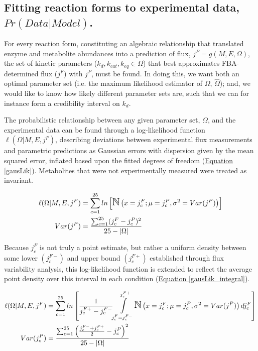 \subsection*{Fitting reaction forms to experimental data, $Pr(Data | Model)$.}

For every reaction form, constituting an algebraic relationship that translated enzyme and metabolite abundances into a prediction of flux, $j^{P} = g(M, E, \Omega)$, the set of kinetic parameters ($k_{d}, k_{cat}, k_{eq} \in \Omega$) that best approximates FBA-determined flux ($j^{F}$) with $j^{P}$, must be found.  In doing this, we want both an optimal parameter set (i.e. the maximum likelihood estimator of $\Omega$, $\hat{\Omega}$); and, we would like to know how likely different parameter sets are, such that we can for instance form a credibility interval on $k_{d}$.

The probabilistic relationship between any given parameter set, $\Omega$, and the experimental data can be found through a log-likelihood function $\ell(\Omega | M, E, j^{P})$, describing deviations between experimental flux measurements and parametric predictions as Gaussian errors with dispersion given by the mean squared error, inflated based upon the fitted degrees of freedom (\hyperref[gausLik]{Equation \ref{gausLik}}). Metabolites that were not experimentally measured were treated as invariant.

\begin{align}
\ell(\Omega | M, E, j^{F}) &= \sum_{c = 1}^{25}ln\left[\mbox{\Large $\mathbb{N}$}\left(x = j^{F}_{c}; \mu = j^{P}_{c}, \sigma^{2} =  Var(j^{P})\right)\right]\notag\\
Var(j^{P}) &= \frac{\sum_{c = 1}^{25} (j^{F}_{c} - j^{P}_{c})^2}{25 - \left\vert{\Omega}\right\vert}\label{gausLik}
\end{align}

Because $j_{c}^{F}$ is not truly a point estimate, but rather a uniform density between some lower $(j_{c}^{F-})$ and upper bound $(j_{c}^{F+})$ established through flux variability analysis, this log-likelihood function is extended to reflect the average point density over this interval in each condition (\hyperref[gausLik_integral]{Equation \ref{gausLik_integral}}).

\begin{align}
\ell(\Omega | M, E, j^{F}) &= \sum_{c = 1}^{25}ln\left[\frac{1}{j_{c}^{F+} - j_{c}^{F-}}\mathlarger{\int}\limits_{j_{c}^{F} = j_{c}^{F-}}^{j_{c}^{F+}} \mbox{\Large $\mathbb{N}$}\left(x = j^{F}_{c}; \mu = j^{P}_{c}, \sigma^{2} =  Var(j^{P})\right)dj^{F}_{c}\right]\notag\\
Var(j^{P}_{c}) &= \frac{\sum_{c = 1}^{25} \left(\frac{j^{F-}_{c} + j^{F+}_{c}}{2} - j^{P}_{c}\right)^2}{25 - \left\vert{\Omega}\right\vert}\label{gausLik_integral}
\end{align}

